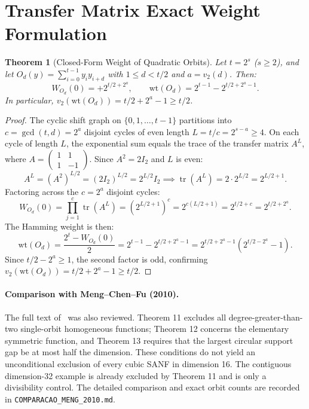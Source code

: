 \documentclass[11pt,a4paper]{article}
\newtheorem{theorem}{Theorem}[section]
\theoremstyle{definition}
\newcommand{\wt}{\mathrm{wt}}
\begin{document}
\section{Transfer Matrix Exact Weight Formulation}

\begin{theorem}[Closed-Form Weight of Quadratic Orbits]
Let $t = 2^s$ ($s \ge 2$), and let $O_d(y) = \sum_{i=0}^{t-1} y_i y_{i+d}$ with $1 \le d < t/2$ and $a = v_2(d)$. Then:
\begin{equation}
W_{O_d}(0) = + 2^{t/2 + 2^a}, \qquad \wt(O_d) = 2^{t-1} - 2^{t/2 + 2^a - 1}.
\end{equation}
In particular, $v_2(\wt(O_d)) = t/2 + 2^a - 1 \ge t/2$.
\end{theorem}

\begin{proof}
The cyclic shift graph on $\{0, 1, \dots, t-1\}$ partitions into $c = \gcd(t, d) = 2^a$ disjoint cycles of even length $L = t/c = 2^{s-a} \ge 4$.
On each cycle of length $L$, the exponential sum equals the trace of the transfer matrix $A^L$, where $A = \begin{pmatrix} 1 & 1 \\ 1 & -1 \end{pmatrix}$. Since $A^2 = 2 I_2$ and $L$ is even:
\begin{equation}
A^L = (A^2)^{L/2} = (2 I_2)^{L/2} = 2^{L/2} I_2 \implies \operatorname{tr}(A^L) = 2 \cdot 2^{L/2} = 2^{L/2+1}.
\end{equation}
Factoring across the $c = 2^a$ disjoint cycles:
\begin{equation}
W_{O_d}(0) = \prod_{j=1}^c \operatorname{tr}(A^L) = (2^{L/2+1})^c = 2^{c(L/2+1)} = 2^{t/2 + c} = 2^{t/2 + 2^a}.
\end{equation}
The Hamming weight is then:
\begin{equation}
\wt(O_d) = \frac{2^t - W_{O_d}(0)}{2} = 2^{t-1} - 2^{t/2 + 2^a - 1} = 2^{t/2 + 2^a - 1} (2^{t/2 - 2^a} - 1).
\end{equation}
Since $t/2 - 2^a \ge 1$, the second factor is odd, confirming $v_2(\wt(O_d)) = t/2 + 2^a - 1 \ge t/2$.
\end{proof}

\paragraph{Comparison with Meng--Chen--Fu (2010).}
The full text of~\cite{meng2010} was also reviewed. Theorem 11 excludes all degree-greater-than-two single-orbit homogeneous functions; Theorem 12 concerns the elementary symmetric function, and Theorem 13 requires that the largest circular support gap be at most half the dimension. These conditions do not yield an unconditional exclusion of every cubic SANF in dimension 16. The contiguous dimension-32 example is already excluded by Theorem 11 and is only a divisibility control. The detailed comparison and exact orbit counts are recorded in \texttt{COMPARACAO\_MENG\_2010.md}.
\end{document}
